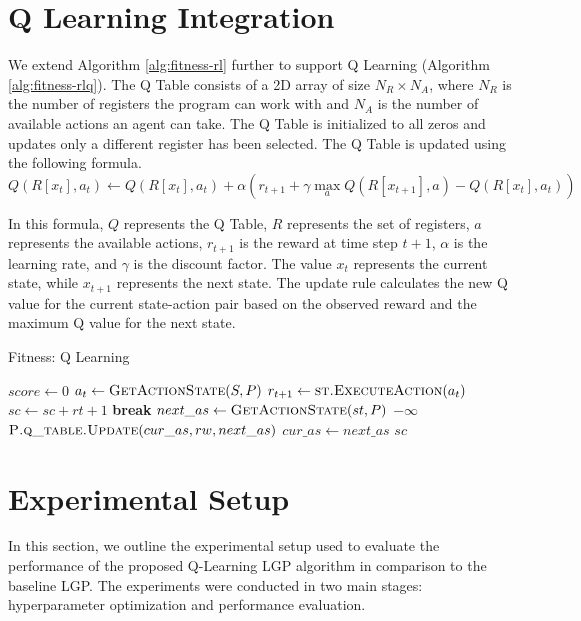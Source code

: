 \documentclass[12pt, final]{dalcsthesis}
\begin{document}
\section{Q Learning Integration}
We extend Algorithm \ref{alg:fitness-rl} further to support Q Learning (Algorithm \ref{alg:fitness-rlq}).
The Q Table consists of a 2D array of size $N_R \times N_A$, where $N_R$ is the number of registers the program can work with and $N_A$ is the number of available actions an agent can take. The Q Table is initialized to all zeros and updates only a different register has been selected. The Q Table is updated using the following formula.
\begin{equation}
	Q(R[x_t], a_t) \leftarrow Q(R[x_t], a_t) + \alpha \left(r_{t+1} + \gamma \max_a Q(R[x_{t+1}], a) - Q(R[x_t], a_t)\right)
\end{equation}

In this formula, $Q$ represents the Q Table, $R$ represents the set of registers, $a$ represents the available actions, $r_{t+1}$ is the reward at time step $t+1$, $\alpha$ is the learning rate, and $\gamma$ is the discount factor. The value $x_t$ represents the current state, while $x_{t+1}$ represents the next state. The update rule calculates the new Q value for the current state-action pair based on the observed reward and the maximum Q value for the next state.

\begin{algorithm}[hb]
	\caption{Fitness: Q Learning}
	\label{alg:fitness-rlq}
	\begin{algorithmic}[1]
		\State $score \gets 0$
		\State $a_{t} \gets \Call{GetActionState}{S, P}$
		\State $r_{t + 1} \gets \Call{st.ExecuteAction}{a_{t}}$
		\State $sc \gets sc + r{t + 1}$
		\State \textbf{break}
		\EndIf
		\State $next\_as \gets \Call{GetActionState}{st, P}$
		\State \Return $-\infty$
		\EndIf
		\State $\Call{P.q\_table.Update}{cur\_as, rw, next\_as}$
		\EndIf
		\State $cur\_as \gets next\_as$
		\EndWhile
		\State \Return $sc$
	\end{algorithmic}
\end{algorithm}


\section{Experimental Setup}

In this section, we outline the experimental setup used to evaluate the performance of the proposed Q-Learning LGP algorithm in comparison to the baseline LGP. The experiments were conducted in two main stages: hyperparameter optimization and performance evaluation.
\end{document}
